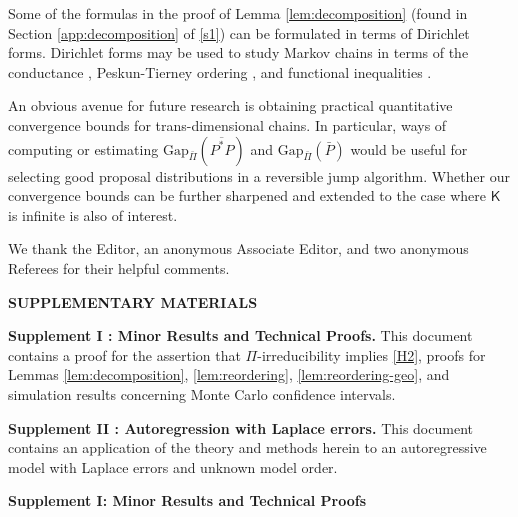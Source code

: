 \documentclass[12pt]{article}
\makeatletter
\def\namedlabel#1#2{\begingroup
	#2%
	\def\@currentlabel{#2}%
	\phantomsection\label{#1}\endgroup
}
\makeatother
\begin{document}
{
Some of the formulas in the proof of Lemma \ref{lem:decomposition} (found in Section \ref{app:decomposition} of \ref{s1}) can be formulated in terms of Dirichlet forms.
Dirichlet forms may be used to study Markov chains in terms of the conductance \citep{lawler1988bounds}, Peskun-Tierney ordering \citep{andrieu2019peskun}, and functional inequalities \citep{power2024weak}.
}

An obvious avenue for future research is obtaining practical quantitative convergence bounds for trans-dimensional chains.
In particular, ways of computing or estimating $\mbox{Gap}_{\bar{\Pi}}(\overline{P^*P})$ and $\mbox{Gap}_{\bar{\Pi}}(\bar{P})$ would be useful for selecting good proposal distributions in a reversible jump algorithm. 
Whether our convergence bounds can be further sharpened and extended to the case where $\mathsf{K}$ is infinite is also of interest.


\vspace{0.5cm}

We thank the Editor, an anonymous Associate Editor, and two anonymous Referees for their helpful comments.








\bigskip
\begin{center}
{\large\bf SUPPLEMENTARY MATERIALS}
\end{center}

{\bf \namedlabel{s1}{Supplement I}: Minor Results and Technical Proofs. } This document contains a proof for the assertion that $\Pi$-irreducibility implies \ref{H2}, proofs for Lemmas \ref{lem:decomposition}, \ref{lem:reordering}, \ref{lem:reordering-geo}, and simulation results concerning Monte Carlo confidence intervals.

{\bf \namedlabel{s2}{Supplement II}: Autoregression with Laplace errors. } This document contains an application of the theory and methods herein to an autoregressive model with Laplace errors and unknown model order. 







\newpage

\begin{center} 
	{\bf \LARGE Supplement I: Minor Results and Technical Proofs}
\end{center}

\appendix
\end{document}
